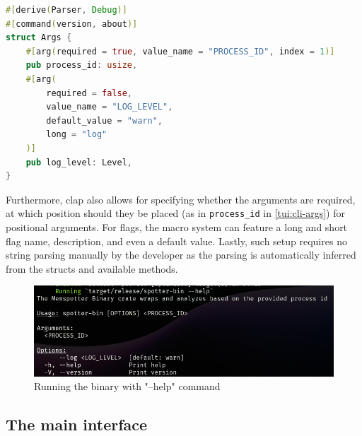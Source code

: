 \begin{lstlisting}[caption=\label{tui:cli-args}{The command line arguments struct}, language=Rust]
#[derive(Parser, Debug)]
#[command(version, about)]
struct Args {
    #[arg(required = true, value_name = "PROCESS_ID", index = 1)]
    pub process_id: usize,
    #[arg(
        required = false,
        value_name = "LOG_LEVEL",
        default_value = "warn",
        long = "log"
    )]
    pub log_level: Level,
}
\end{lstlisting}

Furthermore, clap also allows for specifying whether the arguments are required, at which position should they be placed (as in \verb|process_id| in \autoref{tui:cli-args}) for positional arguments.
For flags, the macro system can feature a long and short flag name, description, and even a default value.
Lastly, such setup requires no string parsing manually by the developer as the parsing is automatically inferred from the structs and available methods.

    \begin{figure}
        \centering
        \includegraphics[width=0.65\linewidth]{cli-help.png}
        \caption{Running the binary with "--help" command}
        \label{fig:cli-help}
    \end{figure}

\subsection{The main interface}

